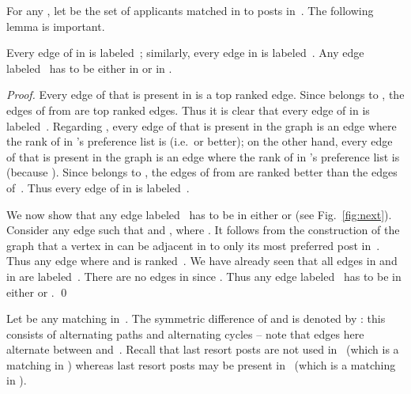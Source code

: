 \documentclass[11pt]{llncs}
\begin{document}
For any , let  be the set of applicants matched in  
to posts in~. The following lemma is important. 

\begin{lemma}
\label{lem:edge-signs}
Every edge of  in  is labeled~; similarly, every edge in  
is labeled~. Any edge labeled~ has to be either in  or in 
.
\end{lemma}
\begin{proof}
Every edge of  that is present in  is a top ranked edge. Since 
 belongs to , the edges of  from  are top ranked edges. Thus it is 
clear that every edge of  in  is labeled~. Regarding , 
every edge of  that is present in the graph  is an edge  where the 
rank of  in 's preference list is  (i.e.\  or better); on the other hand, 
every edge of  that is present in the graph  is an edge  
where the rank of  in 's preference list is  (because ). 
Since  belongs to , the edges of  from  are ranked better than the edges 
of~. Thus every edge of  in  is labeled~.

We now show that any edge labeled~ has to be in either   or
 (see Fig.~\ref{fig:next}). Consider any edge  
such that  and , where . It follows from the 
construction of the graph  that a vertex in  can be adjacent in  to only its most 
preferred post in~. Thus any edge  where  and  is 
ranked~. We have already seen that all edges in  and in  are 
labeled~. There are no edges in  since . 
Thus any edge labeled~ has to be in either   or . \qed
\end{proof}



Let  be any matching in~. The symmetric difference of  and  is denoted by 
: this consists of alternating paths and alternating cycles -- note that
edges here alternate between  and~. 
Recall that last resort posts are not used in~ (which is a matching in ) 
whereas last resort posts may be present in~ (which is a matching in ). 
\end{document}
